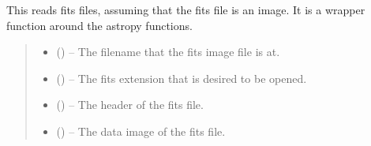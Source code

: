 \documentclass[letterpaper,11pt,english]{sphinxmanual}
\begin{document}

\begin{savenotes}\begin{fulllineitems}
\label{\detokenize{code/opihiexarata.library.fits:opihiexarata.library.fits.read_fits_image_file}}
\pysigstartsignatures
{}
\pysigstopsignatures
\sphinxAtStartPar
This reads fits files, assuming that the fits file is an image. It is a
wrapper function around the astropy functions.
\begin{quote}\begin{description}
\begin{itemize}
\item {} 
\sphinxAtStartPar
{} () – The filename that the fits image file is at.

\item {} 
\sphinxAtStartPar
{} (\sphinxstyleliteralemphasis{\sphinxupquote{, }}) – The fits extension that is desired to be opened.

\end{itemize}

\sphinxAtStartPar
\begin{itemize}
\item {} 
\sphinxAtStartPar
{} () – The header of the fits file.

\item {} 
\sphinxAtStartPar
{} () – The data image of the fits file.

\end{itemize}


\end{description}\end{quote}

\end{fulllineitems}\end{savenotes}
\end{document}
